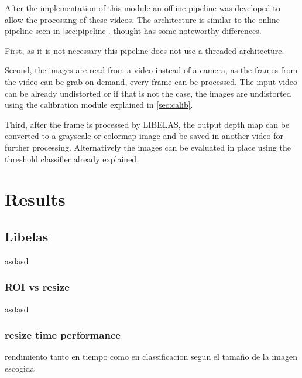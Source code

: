 \documentclass[10pt,a4paper,twocolumn,twoside]{article}
\begin{document}
	After the implementation of this module an offline pipeline was developed to allow the processing of these videos. The architecture is similar to the online pipeline seen in \ref{sec:pipeline}. thought has some noteworthy differences.  
	
	First, as it is not necessary this pipeline does not use a threaded architecture.
	
	Second, the images are read from a video instead of a camera, as the frames from the video can be grab on demand, every frame can be processed. The input video can be already undistorted or if that is not the case, the images are undistorted using the calibration module explained in \ref{sec:calib}. 
	
	Third, after the frame is processed by LIBELAS, the output depth map can be converted to a grayscale or colormap image and be saved in another video for further processing. Alternatively the images can be evaluated in place using the threshold classifier already explained.  
	

	
	\section{Results}
	
	
	\subsection{Libelas}
	asdasd
	\subsubsection{ROI vs resize}
	asdasd
	\label{sec:roiresize}
	
	
	\subsubsection{resize time performance}
	rendimiento tanto en tiempo como en classificacion segun el tamaño de la imagen escogida
	
\end{document}
